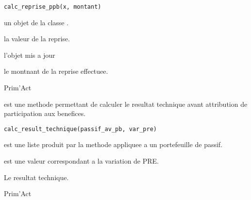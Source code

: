 \documentclass[a4paper]{book}
\begin{document}
%
\begin{Usage}
\begin{verbatim}
calc_reprise_ppb(x, montant)
\end{verbatim}
\end{Usage}
%
\begin{Arguments}
\begin{ldescription}
\item[\code{x}] un objet de la classe .

\item[\code{montant}] la valeur  de la reprise.
\end{ldescription}
\end{Arguments}
%
\begin{Value}
 l'objet  mis a jour

 le montnant de la reprise effectuee.
\end{Value}
%
\begin{Author}\relax
Prim'Act
\end{Author}
%
\begin{Description}\relax
{} est une methode permettant de calculer le resultat technique avant attribution de
participation aux benefices.
\end{Description}
%
\begin{Usage}
\begin{verbatim}
calc_result_technique(passif_av_pb, var_pre)
\end{verbatim}
\end{Usage}
%
\begin{Arguments}
\begin{ldescription}
\item[\code{passif\_av\_pb}] est une liste produit par la methode 
appliquee a un portefeuille de passif.

\item[\code{var\_pre}] est une valeur  correspondant a la variation de PRE.
\end{ldescription}
\end{Arguments}
%
\begin{Value}
Le resultat technique.
\end{Value}
%
\begin{Author}\relax
Prim'Act
\end{Author}
\end{document}
